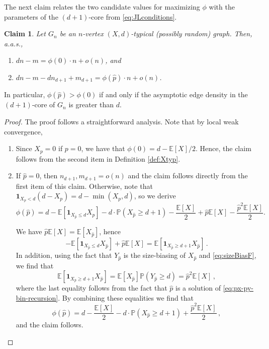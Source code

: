 \documentclass[reqno,english]{amsart}
\numberwithin{equation}{section}
\newtheorem{claim}[theorem]{Claim}
\theoremstyle{definition}{
\newtheorem{example}[theorem]{Example}
\newtheorem{definition}[theorem]{Definition}
\newtheorem*{definition*}{Definition}
\newtheorem{problem}[theorem]{Problem}
\newtheorem{question}[theorem]{Question}
}
\newcommand{\E}{\mathbb E}
\renewcommand{\P}{\mathbb P}
\begin{document}
The next claim relates the two candidate values for maximizing $\phi$ with the parameters of the $(d+1)$-core from \eqref{eq:JLconditions}.
\begin{claim}\label{clm:thisclm}
Let $G_n$ be an $n$-vertex $(X,d)$-typical (possibly random) graph. Then, a.a.s.,
    \begin{enumerate}
    \item \(dn-m=\phi(0)\cdot n+o(n)\), and
    \item \(dn-m-dn_{d+1}+m_{d+1}= \phi(\hat p)\cdot n+o(n)\).
\end{enumerate}
\end{claim}
In particular, $\phi(\hat p)>\phi(0)$ if and only if the asymptotic edge density in the $(d+1)$-core of $G_n$ is greater than $d$.
\begin{proof}
The proof follows a straightforward analysis. Note that by local weak convergence, 
\begin{enumerate}
    \item Since $X_p=0$ if $p=0$, we have that $\phi(0) = d-\E[X]/2$. Hence, the claim follows from the second item in Definition \ref{def:Xtyp}.
    
    \item If $\hat p=0$, then $n_{d+1},m_{d+1}=o(n)$ and the claim follows directly from the first item of this claim. Otherwise, note that $\mathbf 1_{X_p<d}(d-X_p)=d-\min(X_p,d)$, so we derive
    \[
    \phi(\hat p)=d-\E[\mathbf{1}_{X_{\hat p}\le d}X_{\hat p}]-d\cdot\P(X_{\hat p}\ge d+1)-\frac{\E[X]}{2}+\hat p\E[X]-\frac{\hat p^2\E[X]}{2}.
    \]

    We have $\hat p\E[X]=\E[X_{\hat p}]$, hence
    \[
    -\E[\mathbf{1}_{X_{\hat p}\le d}X_{\hat p}]+\hat p\E[X] = 
    \E[\mathbf{1}_{X_{\hat p}\ge d+1}X_{\hat p}]\,.
    \]
    In addition, using the fact that $Y_{\hat p}$ is the size-biasing of $X_{\hat p}$ and \eqref{eq:sizeBiasF}, we find that 
    \begin{equation}\label{eq:simple_hatp}
    \E[\mathbf{1}_{X_{\hat p}\ge d+1}X_{\hat p}]=\E[X_{\hat p}]\P(Y_{\hat p}\ge d) = \hat p^2\E[X]\,,    
    \end{equation}
    where the last equality follows from the fact that $\hat p$ is a solution of \eqref{eq:px-py-bin-recursion}. By combining these equalities we find that
    \[
    \phi(\hat p) = d - \frac{\E[X]}2-d\cdot\P(X_{\hat p}\ge d+1)+\frac{\hat p^2\E[X]}{2}\,,
    \]
    and the claim follows.
\end{enumerate}
\end{proof}
\end{document}

